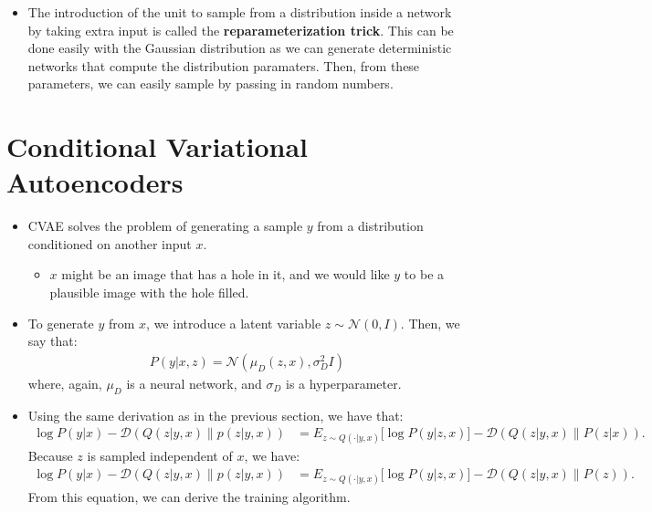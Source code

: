 \documentclass[10pt]{article}
\begin{document}
\begin{itemize}
  	\item The introduction of the unit to sample from a distribution inside a network by taking extra input is called the \textbf{reparameterization trick}. This can be done easily with the Gaussian distribution as we can generate deterministic networks that compute the distribution paramaters. Then, from these parameters, we can easily sample by passing in random numbers.
  \end{itemize}

  \section{Conditional Variational Autoencoders}

  \begin{itemize}
  	\item CVAE solves the problem of generating a sample $y$ from a distribution conditioned on another input $x$.
  	\begin{itemize}
  	  \item $x$ might be an image that has a hole in it, and we would like $y$ to be a plausible image with the hole filled.
  	\end{itemize}

  	\item To generate $y$ from $x$, we introduce a latent variable $z \sim \mathcal{N}(0,I)$. Then, we say that:
  	\begin{align*}
  		P(y|x,z) = \mathcal{N}(\mu_D(z,x), \sigma^2_D I)
  	\end{align*}
  	where, again, $\mu_D$ is a neural network, and $\sigma_D$ is a hyperparameter.

  	\item Using the same derivation as in the previous section, we have that:
  	\begin{align*}
  		\log P(y|x) - \mathcal{D}(Q(z|y,x)\|p(z|y,x))
  		&= E_{z \sim Q(\cdot|y,x)}\big[ \log P(y|z,x) \big] - \mathcal{D}(Q(z|y,x)\|P(z|x)).
  	\end{align*}
  	Because $z$ is sampled independent of $x$, we have:
  	\begin{align*}
  		\log P(y|x) - \mathcal{D}(Q(z|y,x)\|p(z|y,x))
  		&= E_{z \sim Q(\cdot|y,x)}\big[ \log P(y|z,x) \big] - \mathcal{D}(Q(z|y,x)\|P(z)).
  	\end{align*}
  	From this equation, we can derive the training algorithm.
  \end{itemize}
  
    
\end{document}
